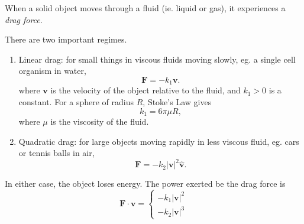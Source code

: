 \documentclass[a4paper]{article}
\begin{document}
\begin{defi}
  When a solid object moves through a fluid (ie. liquid or gas), it experiences a \emph{drag force}.

  There are two important regimes.

  \begin{enumerate}
    \item Linear drag: for small things in viscous fluids moving slowly, eg. a single cell organism in water,
      \[
        \mathbf{F} = -k_1 \mathbf{v}.
      \]
      where $\mathbf{v}$ is the velocity of the object relative to the fluid, and $k_1> 0$ is a constant. For a sphere of radius $R$, Stoke's Law gives
      \[
        k_1 = 6\pi \mu R,
      \]
      where $\mu$ is the viscosity of the fluid.
    \item Quadratic drag: for large objects moving rapidly in less viscous fluid, eg. cars or tennis balls in air,
      \[
        \mathbf{F} = -k_2|\mathbf{v}|^2\hat{\mathbf{v}}.
      \]
  \end{enumerate}
  In either case, the object loses energy. The power exerted be the drag force is
  \[
    \mathbf{F}\cdot \mathbf{v} = \begin{cases} -k_1|\mathbf{v}|^2\\-k_2 |\mathbf{v}|^3 \end{cases}
  \]
\end{defi}
\end{document}
